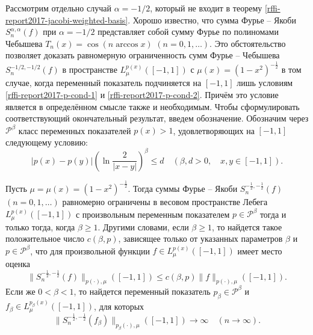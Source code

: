 Рассмотрим отдельно случай $\alpha=-1/2$, который не входит в теорему \ref{rffi-report2017-jacobi-weighted-basis}. Хорошо известно, что сумма Фурье -- Якоби  $S_n^{\alpha,\alpha}(f)$ при $\alpha=-1/2$ представляет собой сумму Фурье по полиномами Чебышева $T_n(x)=\cos(n\arccos x)$ $(n=0,1,\ldots)$. Это обстоятельство позволяет доказать равномерную ограниченность сумм Фурье -- Чебышева $S_n^{-1/2,-1/2}(f)$ в пространстве $L_\mu^{p(x)}([-1,1])$ с $\mu(x)=(1-x^2)^{-\frac12}$ в том случае, когда переменный показатель подчиняется на $[-1,1]$ лишь условиям \ref{rffi-report2017-p-cond-1} и \ref{rffi-report2017-p-cond-2}.  Причём это условие является в определённом смысле также и необходимым. Чтобы сформулировать соответствующий окончательный результат, введем обозначение. Обозначим через $\mathcal{ P}^\beta$ класс переменных показателей $p(x)>1$, удовлетворяющих на $[-1,1]$ следующему условию:
\begin{equation}\label{rffi-report2017-31}
|p(x)-p(y)|\left(\ln\frac{2}{|x-y|}\right)^\beta\le d\quad(\beta, d>0, \quad x,y\in[-1,1]).
\end{equation}

\begin{theorem}\label{rffi-report2017-tcheb-weighted-basis}
Пусть  $\mu=\mu(x)=(1-x^2)^{-\frac12}$. Тогда суммы Фурье -- Якоби $S_n^{-\frac12,-\frac12}(f)$ $(n=0,1,\ldots)$
равномерно ограничены в весовом пространстве Лебега $L_\mu^{p(x)}([-1,1])$ с произвольным переменным показателем $p \in\mathcal{ P}^\beta$ тогда и только тогда, когда $\beta\ge1$. Другими словами, если $\beta\ge1$, то найдется такое положительное число $c(\beta,p)$, зависящее только от указанных параметров $\beta$ и $p\in\mathcal{P}^\beta$,     что для произвольной функции $f\in L_\mu^{p(x)}([-1,1])$ имеет место оценка
\begin{equation}\label{rffi-report2017-32}
\|S_n^{-\frac12,-\frac12}(f)\|_{p(\cdot),\mu}([-1,1])\le c(\beta,p)\|f\|_{p(\cdot),\mu}([-1,1]).
\end{equation}
Если же $0<\beta<1$, то найдется переменный показатель $p_\beta\in\mathcal{ P}^\beta$ и $f_\beta\in L_\mu^{p_\beta(x)}([-1,1])$,
для которых
\begin{equation}\label{rffi-report2017-33}
\|S_n^{-\frac12,-\frac12}(f_\beta)\|_{p_\beta(\cdot),\mu}([-1,1])\to\infty\quad(n\to\infty).
\end{equation}
\end{theorem}

